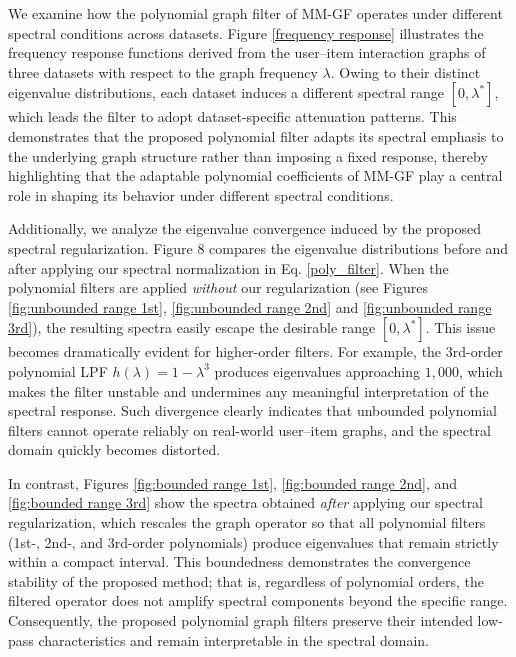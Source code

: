 \documentclass[a4paper,fleqn]{cas-sc}
\begin{document}
We examine how the polynomial graph filter of \textsf{MM-GF} operates under different spectral conditions across datasets. Figure \ref{frequency response} illustrates the frequency response functions derived from the user--item interaction graphs of three datasets with respect to the graph frequency $\lambda$. Owing to their distinct eigenvalue distributions, each dataset induces a different spectral range $[0,\lambda^*]$, which leads the filter to adopt dataset-specific attenuation patterns. This demonstrates that the proposed polynomial filter adapts its spectral emphasis to the underlying graph structure rather than imposing a fixed response, thereby highlighting that the adaptable polynomial coefficients of \textsf{MM-GF} play a central role in shaping its behavior under different spectral conditions.

Additionally, we analyze the eigenvalue convergence induced by the proposed spectral regularization. Figure 8 compares the eigenvalue distributions before and after applying our spectral normalization in Eq. \eqref{poly_filter}. When the polynomial filters are applied \textit{without} our regularization (see Figures \ref{fig:unbounded range 1st}, \ref{fig:unbounded range 2nd} and \ref{fig:unbounded range 3rd}), the resulting spectra easily escape the desirable range $[0, \lambda^{\ast}]$. This issue becomes dramatically evident for higher-order filters. For example, the 3rd-order polynomial LPF $h(\lambda) = 1 - \lambda^3$ produces eigenvalues approaching $1,000$, which makes the filter unstable and undermines any meaningful interpretation of the spectral response. Such divergence clearly indicates that unbounded polynomial filters cannot operate reliably on real-world user--item graphs, and the spectral domain quickly becomes distorted.

In contrast, Figures \ref{fig:bounded range 1st}, \ref{fig:bounded range 2nd}, and \ref{fig:bounded range 3rd} show the spectra obtained \textit{after} applying our spectral regularization, which rescales the graph operator so that all polynomial filters (1st-, 2nd-, and 3rd-order polynomials) produce eigenvalues that remain strictly within a compact interval. This boundedness demonstrates the convergence stability of the proposed method; that is, regardless of polynomial orders, the filtered operator does not amplify spectral components beyond the specific range. Consequently, the proposed polynomial graph filters preserve their intended low-pass characteristics and remain interpretable in the spectral domain.
\end{document}
